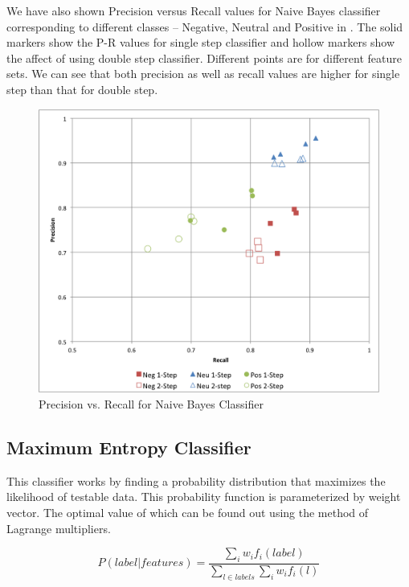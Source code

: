 We have also shown Precision versus Recall values for Naive Bayes classifier
corresponding to different classes – Negative, Neutral and Positive in
. The solid markers show the P-R values for single step
classifier and hollow markers show the affect of using double step classifier.
Different points are for different feature sets. We can see that both precision
as well as recall values are higher for single step than that for double step.

\begin{figure}[h!]
\centering
\includegraphics[width=\textwidth]{img/NB_PvsR.png}
\caption{Precision vs. Recall for Naive Bayes Classifier}
\label{fig:nb_pr}
\end{figure}


\subsection{Maximum Entropy Classifier}

This classifier works by finding a probability distribution that maximizes the
likelihood of testable data. This probability function is parameterized by
weight vector. The optimal value of which can be found out using the method of
Lagrange multipliers.

\begin{equation}
P(label|features)
	= \frac	{\sum_i  w_i f_i(label)}
			{\sum_{l \in labels} \sum_i  w_i f_i(l) }
\end{equation}

